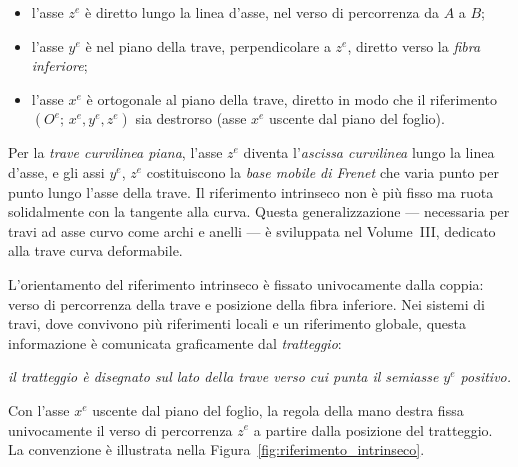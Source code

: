 \begin{itemize}[nosep]
	\item l'asse $z^e$ è diretto lungo la linea d'asse,
	nel verso di percorrenza da $A$ a $B$;
	\item l'asse $y^e$ è nel piano della trave,
	perpendicolare a $z^e$, diretto verso la
	\emph{fibra inferiore};
	\item l'asse $x^e$ è ortogonale al piano della
	trave, diretto in modo che il riferimento
	$(O^e;\, x^e, y^e, z^e)$ sia destrorso
	(asse $x^e$ uscente dal piano del foglio).
\end{itemize}

\begin{oss}
	Per la \emph{trave curvilinea piana}, l'asse $z^e$
	diventa l'\emph{ascissa curvilinea} lungo la linea
	d'asse, e gli assi $y^e$, $z^e$ costituiscono la
	\emph{base mobile di Frenet} che varia punto per
	punto lungo l'asse della trave. Il riferimento
	intrinseco non è più fisso ma ruota solidalmente
	con la tangente alla curva. Questa generalizzazione
	--- necessaria per travi ad asse curvo come archi
	e anelli --- è sviluppata nel Volume~III, dedicato
	alla trave curva deformabile.
\end{oss}


L'orientamento del riferimento intrinseco è fissato
univocamente dalla coppia: verso di percorrenza della
trave e posizione della fibra inferiore. Nei sistemi
di travi, dove convivono più riferimenti locali e
un riferimento globale, questa informazione è
comunicata graficamente dal \emph{tratteggio}:

\begin{center}
	\textit{il tratteggio è disegnato sul lato della trave
		verso cui punta il semiasse $y^e$ positivo.}
\end{center}

Con l'asse $x^e$ uscente dal piano del foglio, la
regola della mano destra fissa univocamente il verso
di percorrenza $z^e$ a partire dalla posizione del
tratteggio. La convenzione è illustrata nella
Figura~\ref{fig:riferimento_intrinseco}.








